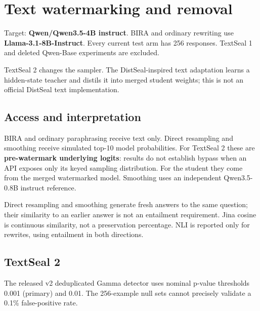 \section{Text watermarking and
removal}\label{record-docs-watermarking-text-md-text-watermarking-and-removal}

Target: \textbf{Qwen/Qwen3.5-4B instruct}. BIRA and ordinary rewriting
use \textbf{Llama-3.1-8B-Instruct}. Every current test arm has 256
responses. TextSeal 1 and deleted Qwen-Base experiments are excluded.

TextSeal 2 changes the sampler. The DistSeal-inspired text adaptation
learns a hidden-state teacher and distils it into merged student
weights; this is not an official DistSeal text implementation.

\subsection{Access and
interpretation}\label{record-docs-watermarking-text-md-access-and-interpretation}

BIRA and ordinary paraphrasing receive text only. Direct resampling and
smoothing receive simulated top-10 model probabilities. For TextSeal 2
these are \textbf{pre-watermark underlying logits}: results do not
establish bypass when an API exposes only its keyed sampling
distribution. For the student they come from the merged watermarked
model. Smoothing uses an independent Qwen3.5-0.8B instruct reference.

Direct resampling and smoothing generate fresh answers to the same
question; their similarity to an earlier answer is not an entailment
requirement. Jina cosine is continuous similarity, not a preservation
percentage. NLI is reported only for rewrites, using entailment in both
directions.

\subsection{TextSeal
2}\label{record-docs-watermarking-text-md-textseal-2}

The released v2 deduplicated Gamma detector uses nominal p-value
thresholds 0.001 (primary) and 0.01. The 256-example null sets cannot
precisely validate a 0.1\% false-positive rate.

